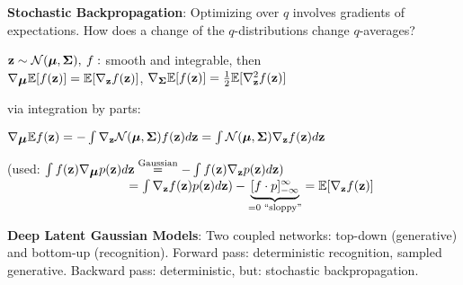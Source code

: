     \textbf{Stochastic Backpropagation}: Optimizing over $q$ involves gradients of expectations. How does a change of the $q$-distributions change $q$-averages?
    
    \tab $\mathbf z\sim \mathcal{N}(\mbox{\boldmath $\mu$},\mathbf \Sigma),\> f:$ smooth and integrable, then\\
    \tab $\nabla_{\mbox{\boldmath $\mu$}} \mathbb E \lbrack f(\mathbf z) \rbrack = \mathbb E \lbrack \nabla_\mathbf z f(\mathbf z) \rbrack$, $\nabla_{\mathbf \Sigma} \mathbb E \lbrack f(\mathbf z) \rbrack=\frac{1}{2} \mathbb E \lbrack \nabla^2_{\mathbf z} f(\mathbf z) \rbrack$
    
    via integration by parts:
    
    \tab $\nabla_{\mbox{\boldmath $\mu$}} \mathbb E f(\mathbf z) = - \int \nabla_{\mathbf z} \mathcal{N} (\mbox{\boldmath $\mu$},\mathbf \Sigma)f(\mathbf z)d\mathbf z=\int\mathcal{N}(\mbox{\boldmath $\mu$},\mathbf \Sigma)\nabla_{\mathbf z}f(\mathbf z)d\mathbf z$
    
    \tab (used: $\int f(\mathbf z)\nabla_{\mbox{\boldmath $\mu$}}p(\mathbf z)d\mathbf z   \overset{\text{Gaussian}}{=}-\int f(\mathbf z) \nabla_{\mathbf z}p(\mathbf z)d\mathbf z) $\\
    \tab $\phantom{\text{(used: } f(\vz)\nabla_{\vmu}p(\vz)d\vz}= \int \nabla_{\vz}f(\vz) p(\vz)d\vz) - \underbrace{\lbrack f\cdot p \rbrack^\infty_{-\infty}}_{=0\text{ ``sloppy''}} = \E \lbrack \nabla_{\vz} f(\vz)\rbrack$
    
    \textbf{Deep Latent Gaussian Models}: Two coupled networks: top-down (generative) and bottom-up (recognition). Forward pass: deterministic recognition, sampled generative. Backward pass: deterministic, but: stochastic backpropagation.
